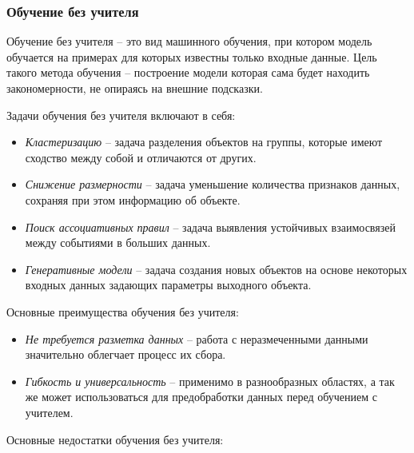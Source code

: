 \documentclass[../part_1.tex]{subfiles}
\begin{document}
\subsubsection{Обучение без учителя} 
    \label{sec:without_teacher}
    \par Обучение без учителя --  это вид машинного обучения, при котором модель обучается на примерах для которых известны только входные данные. Цель такого метода обучения -- построение модели которая сама будет находить закономерности, не опираясь на внешние подсказки. 
    \par Задачи обучения без учителя включают в себя:
    \begin{itemize}
        \item \textit{Кластеризацию} -- задача разделения объектов на группы, которые имеют сходство между собой и отличаются от других.
        \item \textit{Снижение размерности} -- задача уменьшение количества признаков данных, сохраняя при этом информацию об объекте.
        \item \textit{Поиск ассоциативных правил} -- задача выявления устойчивых взаимосвязей между событиями в больших данных.
        \item \textit{Генеративные модели} -- задача создания новых объектов на основе некоторых входных данных задающих параметры выходного объекта.
    \end{itemize}
    \par Основные преимущества обучения без учителя:
    \begin{itemize}
        \item \textit{Не требуется разметка данных} -- работа с неразмеченными данными значительно облегчает процесс их сбора.
        \item \textit{Гибкость и универсальность} -- применимо в разнообразных областях, а так же может использоваться для предобработки данных перед обучением с учителем.
    \end{itemize}
    \par Основные недостатки обучения без учителя:
\end{document}
